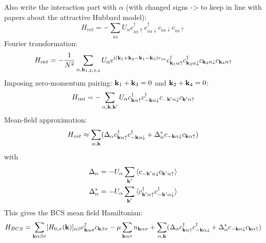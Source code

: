 Also write the interaction part with \(\alpha\) (with changed signs -> to keep in line with papers about the attractive Hubbard model):
\begin{equation}
    H_{int} = - \sum_{i \alpha} U_{\alpha} c_{i\alpha \uparrow}^{\dagger} c_{i\alpha \downarrow}^{\dagger} c_{i\alpha \downarrow} c_{i\alpha \uparrow}
\end{equation}
Fourier transformation:
\begin{equation}
    H_{int} = - \frac{1}{N^2} \sum_{\alpha, \bm{\mathrm{k}}_{1, 2, 3, 4}} U_{\alpha} e^{\mathrm{i} (\bm{\mathrm{k}}_1 + \bm{\mathrm{k}}_4 - \bm{\mathrm{k}}_1 - \bm{\mathrm{k}}_3) r_{i \alpha}}  c_{\bm{\mathrm{k}}_1 \alpha \uparrow}^{\dagger} c_{\bm{\mathrm{k}}_3 \alpha \downarrow}^{\dagger} c_{\bm{\mathrm{k}}_2 \alpha \downarrow} c_{\bm{\mathrm{k}}_4 \alpha \uparrow}
\end{equation}
Imposing zero-momentum pairing: \(\bm{\mathrm{k}}_1 + \bm{\mathrm{k}}_3 = 0\) and \(\bm{\mathrm{k}}_2 + \bm{\mathrm{k}}_4 = 0\):
\begin{align}
    H_{int} = - \sum_{\alpha, \bm{\mathrm{k}}, \bm{\mathrm{k}}^{\prime}} U_{\alpha} c_{\bm{\mathrm{k}} \alpha \uparrow}^{\dagger} c_{-\bm{\mathrm{k}} \alpha \downarrow}^{\dagger} c_{-\bm{\mathrm{k}}^{\prime} \alpha \downarrow} c_{\bm{\mathrm{k}}^{\prime} \alpha \uparrow}
\end{align}
Mean-field approximation:
\begin{align}
    H_{int} \approx \sum_{\alpha, \bm{\mathrm{k}}} (\Delta_{\alpha} c_{\bm{\mathrm{k}} \alpha \uparrow}^{\dagger} c_{-\bm{\mathrm{k}} \alpha \downarrow}^{\dagger} + \Delta_{\alpha}^* c_{-\bm{\mathrm{k}} \alpha \downarrow} c_{\bm{\mathrm{k}} \alpha \uparrow})
\end{align}
with
\begin{align}
    \Delta_{\alpha} &= - U_{\alpha} \sum_{\bm{\mathrm{k}}^{\prime}} \braket{c_{-\bm{\mathrm{k}}^{\prime} \alpha \downarrow} c_{\bm{\mathrm{k}}^{\prime} \alpha \uparrow}} \\
    \Delta_{\alpha}^* &= - U_{\alpha} \sum_{\bm{\mathrm{k}}^{\prime}} \braket{c_{\bm{\mathrm{k}}^{\prime} \alpha \uparrow}^{\dagger} c_{-\bm{\mathrm{k}}^{\prime} \alpha \downarrow}^{\dagger}}
\end{align}
This gives the BCS mean field Hamiltonian:
\begin{align}
    H_{BCS} = \sum_{\bm{\mathrm{k}} \alpha \beta \sigma} [H_{0, \sigma} (\bm{\mathrm{k}})]_{\alpha \beta} c_{\bm{\mathrm{k}} \alpha \sigma}^{\dagger} c_{\bm{\mathrm{k}} \beta \sigma}
    -\mu \sum_{\bm{\mathrm{k}} \alpha \sigma} n_{\bm{\mathrm{k}} \alpha \sigma}
    + \sum_{\alpha, \bm{\mathrm{k}}} (\Delta_{\alpha} c_{\bm{\mathrm{k}} \alpha \uparrow}^{\dagger} c_{-\bm{\mathrm{k}} \alpha \downarrow}^{\dagger} + \Delta_{\alpha}^* c_{-\bm{\mathrm{k}} \alpha \downarrow} c_{\bm{\mathrm{k}} \alpha \uparrow})
\end{align}
